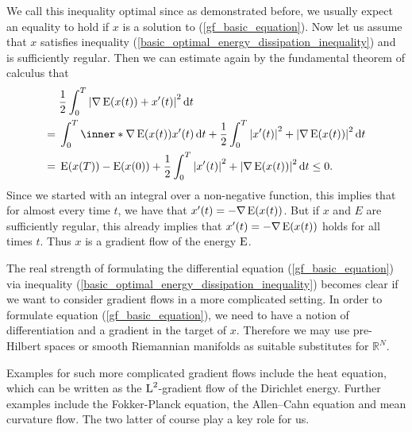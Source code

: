 We call this inequality optimal since as demonstrated before, we usually expect 
an equality to hold if $ x $ is a solution to (\ref{gf_basic_equation}).
Now let us assume that $ x $ satisfies inequality
(\ref{basic_optimal_energy_dissipation_inequality}) and is sufficiently regular.
Then we can estimate again by the fundamental theorem of calculus that
\begin{align*}
	& \frac{ 1 }{ 2 }
	\int_{ 0 }^{ T }
		\abs{
			\nabla \energy ( x ( t ) )
			+
			x' ( t ) 
		}^{ 2 }
	\dd{ t }
	\\
	={} &
	\int_{ 0 }^{ T }
		\inner*{ \nabla \energy ( x ( t ) ) }{ x' ( t ) }
	\dd{ t }
	+
	\frac{ 1 }{ 2 }
	\int_{ 0 }^{ T }
		\abs{ x' ( t ) }^{ 2 }
		+
		\abs{ \nabla \energy ( x ( t ) ) }^{ 2 }
	\dd{ t }
	\\
	={} &
	\energy ( x ( T ) ) - \energy ( x ( 0 ) ) 
	+
	\frac{ 1 }{ 2 }
	\int_{ 0 }^{ T }
		\abs{ x' ( t ) }^{ 2 }
		+
		\abs{ \nabla \energy ( x ( t ) ) }^{ 2 }
	\dd{ t }
	\leq 0.
\end{align*}
Since we started with an integral over a non-negative function, this implies 
that for almost every time $ t $, we have that $ x' ( t ) = - \nabla \operatorname{E} ( 
x ( t ) ) $. But if $ x $ and $ E $ are sufficiently regular, this already 
implies that $ x' ( t ) = - \nabla \operatorname{E} ( x ( t ) ) $ holds for all times $ 
t 
$.
Thus $ x $ is a gradient flow of 
the energy $ \operatorname{E} $.

The real strength of formulating the differential equation 
(\ref{gf_basic_equation}) via inequality 
(\ref{basic_optimal_energy_dissipation_inequality}) becomes clear if we want to 
consider gradient flows in a more complicated setting. In order to formulate 
equation (\ref{gf_basic_equation}), we need to have a notion of differentiation 
and a gradient in the target of $ x $. Therefore we may use pre-Hilbert spaces 
or smooth Riemannian manifolds as suitable substitutes for $ \mathbb{ R }^{ N 
} $. 

Examples for such more complicated gradient flows include the heat equation, 
which can be written as the $ \operatorname{L}^{ 2 } $-gradient flow of the Dirichlet 
energy. 
Further examples include  
the Fokker-Planck equation, the Allen--Cahn equation and mean curvature flow. 
The two latter of course play a key role for us.
\begin{comment}
A first example for a generalization is therefore the heat equation $ \partial_{ t } u - \Delta u = 0 $ for some open and bounded set $ \Omega $. As our space, we shall take $ \mathrm{ H }_{ 0 }^{ 1 } ( \Omega ) $ equipped with the inner product
\begin{equation*}
	\inner*{ u }{ v }
	\coloneqq
	\int
		\inner*{ u }{ v }
	\dd{ x }.
\end{equation*}
Our energy is given by the Dirichlet functional
\begin{equation*}
	\energy ( u ) \coloneqq
	\frac{ 1 }{ 2 }
	\int
		\abs{ \nabla u }^{ 2 }
	\dd{ x }
\end{equation*}
Then we can compute that at least on $ \mathrm{ H }_{ 0 }^{ 1 } \cap \mathrm{ H }^{ 2 } ( \Omega ) $, the Fréchet derivative of $ \energy $ is given by $ \diff ( E ) ( u ) [ v ] = - \int \Delta u v \dd{ x } $.
\end{comment}

